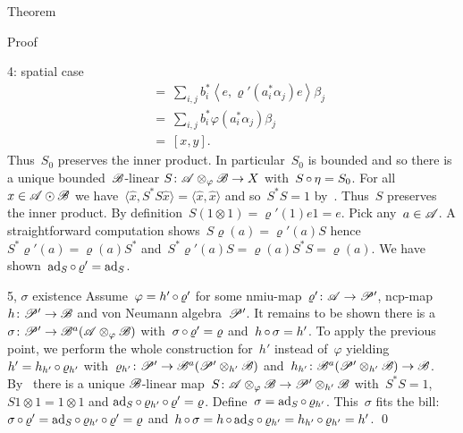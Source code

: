 \begin{parsec}
\begin{point}{Theorem}
\begin{point}{Proof}
\begin{point}{4: spatial case}
\begin{align*}
    & \ =\ \sum_{i,j} b_i^*\left<e,  \varrho'(a_i^*\alpha_j)e \right>\beta_j \\
    & \ =\ \sum_{i,j} b_i^* \varphi(a_i^*\alpha_j) \beta_j \\
    & \ =\ [x,y].
\end{align*}
Thus~$S_0$ preserves the inner product. In particular~$S_0$ is bounded
    and so there is a unique bounded~$\mathscr{B}$-linear
    $S \colon \mathscr{A} \otimes_\varphi \mathscr{B} \to X$
    with~$S \mathop{\circ} \eta = S_0$.
    For all~$x \in \mathscr{A} \odot \mathscr{B}$
        we have~$\langle \hat{x}, S^*S \hat{x}\rangle = \langle \hat{x}, \hat{x} \rangle$
    and so~$S^*S=1$
    by~.
Thus~$S$ preserves the inner product.
By definition~$S (1\otimes1) = \varrho'(1)e 1 = e$.
Pick any~$a \in \mathscr{A}$.
A straightforward computation shows~$S \varrho(a) = \varrho'(a) S$
hence~$S^* \varrho'(a) = \varrho(a) S^*$
and~$S^* \varrho'(a) S =  \varrho(a) S^*S= \varrho(a)$.
We have shown~$\mathrm{ad}_S \mathop{\circ} \varrho' = \mathrm{ad}_S$.
\end{point}
\begin{point}{5, $\sigma$ existence}
Assume~$\varphi = h' \mathop{\circ} \varrho'$
    for some nmiu-map~$\varrho'\colon \mathscr{A} \to \mathscr{P}'$,
        ncp-map~$h\colon \mathscr{P}' \to \mathscr{B}$
        and von Neumann algebra~$\mathscr{P}'$.
It remains to be shown there is a ~$\sigma\colon \mathscr{P}' \to \mathscr{B}^a(\mathscr{A}\otimes_\varphi\mathscr{B})$
with~$\sigma\mathop{\circ}\varrho'=\varrho$ and~$h \mathop{\circ} \sigma = h'$.
To apply the previous point,
    we perform the whole construction for~$h'$ instead of~$\varphi$
    yielding
    $h' = h_{h'} \mathop{\circ} \varrho_{h'}$
    with~$\varrho_{h'} \colon \mathscr{P}' \to \mathscr{B}^a (\mathscr{P}' \otimes_{h'} \mathscr{B})$
    and~$h_{h'} \colon \mathscr{B}^a(\mathscr{P}' \otimes_{h'} \mathscr{B}) \to \mathscr{B}$.
By~
    there is a unique 
    $\mathscr{B}$-linear map~$S\colon \mathscr{A} \otimes_{\varphi} \mathscr{B} \to
                                \mathscr{P}' \otimes_{h'} \mathscr{B}$
with~$S^*S = 1$, $S 1\otimes1 = 1\otimes1$ and
$\mathrm{ad}_S \mathop{\circ} \varrho_{h'}\mathop{\circ} \varrho' = \varrho$.
Define~$\sigma = \mathrm{ad}_S \mathop{\circ} \varrho_{h'}$.
This~$\sigma$ fits the bill:
$\sigma \mathop{\circ} \varrho' = \mathrm{ad}_S \mathop{\circ} \varrho_{h'} \mathop{\circ} \varrho'
                                = \varrho$
and~$h \mathop{\circ} \sigma = h \mathop{\circ} \mathrm{ad}_S \mathop{\circ} \varrho_{h'}
= h_{h'} \mathop{\circ} \varrho_{h'} = h'$. \qed
\end{point}
\end{point}
\end{point}
\end{parsec}

